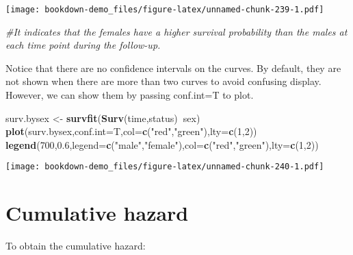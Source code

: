 \documentclass[]{book}
\newenvironment{Shaded}{\begin{snugshade}}{\end{snugshade}}
\newcommand{\KeywordTok}[1]{\textcolor[rgb]{0.13,0.29,0.53}{\textbf{#1}}}
\newcommand{\DataTypeTok}[1]{\textcolor[rgb]{0.13,0.29,0.53}{#1}}
\newcommand{\DecValTok}[1]{\textcolor[rgb]{0.00,0.00,0.81}{#1}}
\newcommand{\FloatTok}[1]{\textcolor[rgb]{0.00,0.00,0.81}{#1}}
\newcommand{\StringTok}[1]{\textcolor[rgb]{0.31,0.60,0.02}{#1}}
\newcommand{\CommentTok}[1]{\textcolor[rgb]{0.56,0.35,0.01}{\textit{#1}}}
\newcommand{\OperatorTok}[1]{\textcolor[rgb]{0.81,0.36,0.00}{\textbf{#1}}}
\newcommand{\NormalTok}[1]{#1}
\theoremstyle{definition}
\theoremstyle{definition}
\theoremstyle{definition}
\theoremstyle{remark}
\begin{document}
\texttt{[image: bookdown-demo\_files/figure-latex/unnamed-chunk-239-1.pdf]}

\begin{Shaded}
\begin{Highlighting}[]
\CommentTok{#It indicates that the females have a higher survival probability than the males at each time point during the follow-up.}
\end{Highlighting}
\end{Shaded}

Notice that there are no confidence intervals on the curves. By default,
they are not shown when there are more than two curves to avoid
confusing display. However, we can show them by passing conf.int=T to
plot.

\begin{Shaded}
\begin{Highlighting}[]
\NormalTok{surv.bysex <-}\StringTok{ }\KeywordTok{survfit}\NormalTok{(}\KeywordTok{Surv}\NormalTok{(time,status)}\OperatorTok{~}\NormalTok{sex)}
\KeywordTok{plot}\NormalTok{(surv.bysex,}\DataTypeTok{conf.int=}\NormalTok{T,}\DataTypeTok{col=}\KeywordTok{c}\NormalTok{(}\StringTok{"red"}\NormalTok{,}\StringTok{"green"}\NormalTok{),}\DataTypeTok{lty=}\KeywordTok{c}\NormalTok{(}\DecValTok{1}\NormalTok{,}\DecValTok{2}\NormalTok{))}
\KeywordTok{legend}\NormalTok{(}\DecValTok{700}\NormalTok{,}\FloatTok{0.6}\NormalTok{,}\DataTypeTok{legend=}\KeywordTok{c}\NormalTok{(}\StringTok{"male"}\NormalTok{,}\StringTok{"female"}\NormalTok{),}\DataTypeTok{col=}\KeywordTok{c}\NormalTok{(}\StringTok{"red"}\NormalTok{,}\StringTok{"green"}\NormalTok{),}\DataTypeTok{lty=}\KeywordTok{c}\NormalTok{(}\DecValTok{1}\NormalTok{,}\DecValTok{2}\NormalTok{))}
\end{Highlighting}
\end{Shaded}

\texttt{[image: bookdown-demo\_files/figure-latex/unnamed-chunk-240-1.pdf]}

\section{Cumulative hazard}\label{cumulative-hazard}

To obtain the cumulative hazard:
\end{document}
